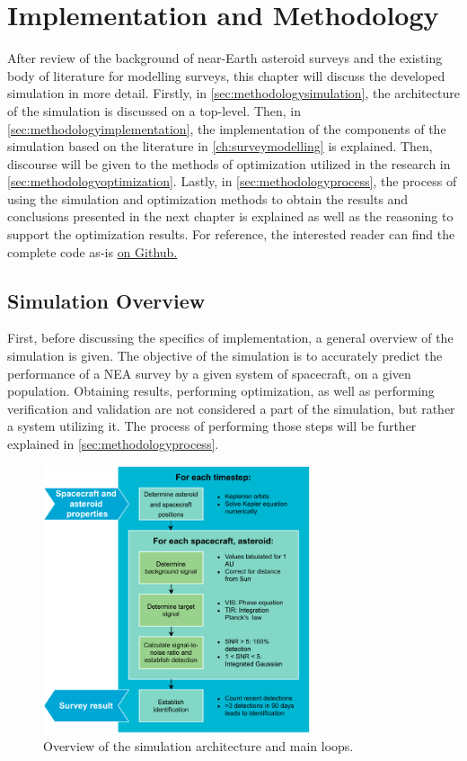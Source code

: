 \chapter{Implementation and Methodology}
\label{ch:experimental}
After review of the background of near-Earth asteroid surveys and the existing body of literature for modelling surveys, this chapter will discuss the developed simulation in more detail. Firstly, in \autoref{sec:methodologysimulation}, the architecture of the simulation is discussed on a top-level. Then, in \autoref{sec:methodologyimplementation}, the implementation of the components of the simulation based on the literature in \autoref{ch:surveymodelling} is explained. Then, discourse will be given to the methods of optimization utilized in the research in \autoref{sec:methodologyoptimization}. Lastly, in \autoref{sec:methodologyprocess}, the process of using the simulation and optimization methods to obtain the results and conclusions presented in the next chapter is explained as well as the reasoning to support the optimization results. For reference, the interested reader can find the complete code as-is \href{https://github.com/ArjanVermeulen97/thesis-code.git}{on Github.}

\section{Simulation Overview}
\label{sec:methodologysimulation}
First, before discussing the specifics of implementation, a general overview of the simulation is given. The objective of the simulation is to accurately predict the performance of a NEA survey by a given system of spacecraft, on a given population. Obtaining results, performing optimization, as well as performing verification and validation are not considered a part of the simulation, but rather a system utilizing it. The process of performing those steps will be further explained in \autoref{sec:methodologyprocess}.\\

\begin{figure}[htbp]
 \centering
 \includegraphics[width=0.7\textwidth]{img/simulation_overview.pdf}
 \caption{Overview of the simulation architecture and main loops.}
 \label{fig:simulation_overview}
\end{figure}

